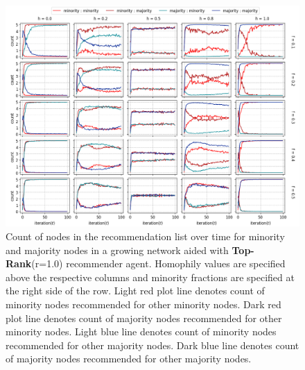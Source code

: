 \begin{appendices}

\begin{figure}[h!]
	\centering
	\includegraphics[width=1.0\textwidth]{images/count_top10.png}
	\caption{Count of nodes in the recommendation list over time for minority and majority nodes in a growing network aided with \textbf{Top-Rank}(r=1.0) recommender agent. Homophily values are specified above the respective columns and minority fractions are specified at the right side of the row. Light red plot line denotes count of minority nodes recommended for other minority nodes. Dark red plot line denotes count of majority nodes recommended for other minority nodes. Light blue line denotes count of minority nodes recommended for other majority nodes. Dark blue line denotes count of majority nodes recommended for other majority nodes.}
	\label{count_top10}
\end{figure}

\end{appendices}